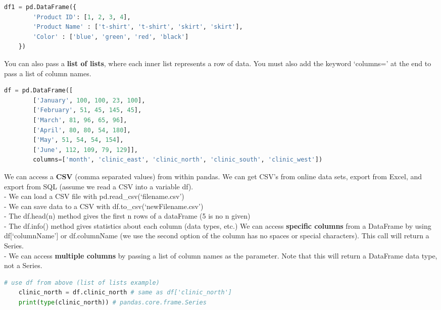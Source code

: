 \documentclass[11pt, a4paper]{article}
\begin{document}
\begin{spacing}{1.1}
\begin{lstlisting}[language=Python]
	df1 = pd.DataFrame({
		'Product ID': [1, 2, 3, 4],
		'Product Name' : ['t-shirt', 't-shirt', 'skirt', 'skirt'],
		'Color' : ['blue', 'green', 'red', 'black']
	}) \end{lstlisting}\vspace*{1mm}
	You can also pass a \textbf{list of lists}, where each inner list represents a row of data. You must also add the keyword `columns=' at the end to pass a list of column names.
	\begin{lstlisting}[language=Python]
	df = pd.DataFrame([
		['January', 100, 100, 23, 100],
		['February', 51, 45, 145, 45],
		['March', 81, 96, 65, 96],
		['April', 80, 80, 54, 180],
		['May', 51, 54, 54, 154],
		['June', 112, 109, 79, 129]],
		columns=['month', 'clinic_east', 'clinic_north', 'clinic_south', 'clinic_west']) \end{lstlisting}\vspace*{1mm}
	We can access a \textbf{CSV} (comma separated values) from within pandas. We can get CSV's from online data sets, export from Excel, and export from SQL (assume we read a CSV into a variable df). \\
	\hspace*{4mm} - We can load a CSV file with pd.read\_csv(`filename.csv') \\
	\hspace*{4mm} - We can save data to a CSV with df.to\_csv(`newFilename.csv') \\
	\hspace*{4mm} - The df.head(n) method gives the first n rows of a dataFrame (5 is no n given) \\
	\hspace*{4mm} - The df.info() method gives statistics about each column (data types, etc.) \newpage
	\noindent We can access \textbf{specific columns} from a DataFrame by using df[`columnName'] or df.columnName (we use the second option of the column has no spaces or special characters). This call will return a Series. \\
	\hspace*{4mm} - We can access \textbf{multiple columns} by passing a list of column names as the parameter. Note that \hspace*{7mm} this will return a DataFrame data type, not a Series.
	\begin{lstlisting}[language=Python]
	# use df from above (list of lists example)
	clinic_north = df.clinic_north # same as df['clinic_north']
	print(type(clinic_north)) # pandas.core.frame.Series
	

\end{lstlisting}
\end{spacing}
\end{document}
